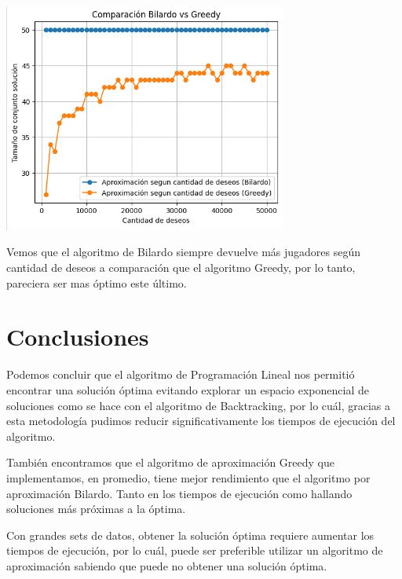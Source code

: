 \documentclass{estilo}
\begin{document}
\begin{center}
\includegraphics[width=0.7\textwidth]{img/bilardo_vs_greedy_2.png}

Vemos que el algoritmo de Bilardo siempre devuelve más jugadores según cantidad de deseos a comparación que el algoritmo Greedy, por lo tanto, pareciera ser mas óptimo este último.
\end{center}

\section{Conclusiones}

Podemos concluir que el algoritmo de Programación Lineal nos permitió encontrar una solución óptima evitando explorar un espacio exponencial de soluciones como se hace con el algoritmo de Backtracking, por lo cuál, gracias a esta metodología pudimos reducir significativamente los tiempos de ejecución del algoritmo.

También encontramos que el algoritmo de aproximación Greedy que implementamos, en promedio, tiene mejor rendimiento que el algoritmo por aproximación Bilardo. Tanto en los tiempos de ejecución como hallando soluciones más próximas a la óptima.

Con grandes sets de datos, obtener la solución óptima requiere aumentar los tiempos de ejecución, por lo cuál, puede ser preferible utilizar un algoritmo de aproximación sabiendo que puede no obtener una solución óptima. 
\end{document}
